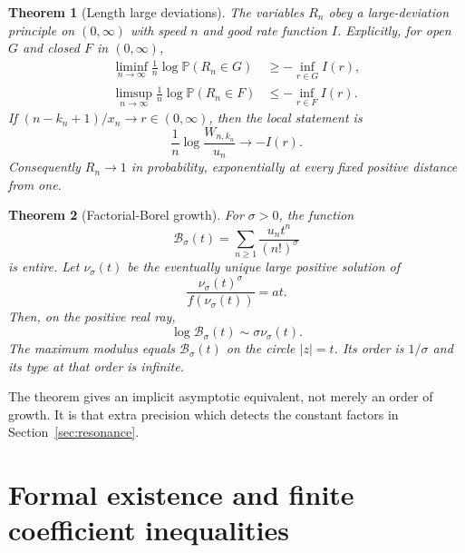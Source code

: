 \documentclass[11pt,a4paper]{article}
\numberwithin{equation}{section}
\newtheorem{theorem}{Theorem}[section]
\theoremstyle{definition}
\theoremstyle{remark}
\newcommand{\Bcal}{\mathcal B}
\newcommand{\Prob}{\mathbb P}
\begin{document}
\begin{theorem}[Length large deviations]
\label{thm:ldp}
The variables $R_n$ obey a large-deviation principle on $(0,\infty)$
with speed $n$ and good rate function $I$. Explicitly, for open $G$ and
closed $F$ in $(0,\infty)$,
\begin{align}
 \liminf_{n\to\infty}\frac1n\log\Prob(R_n\in G)
 &\ge-\inf_{r\in G}I(r),\\
 \limsup_{n\to\infty}\frac1n\log\Prob(R_n\in F)
 &\le-\inf_{r\in F}I(r).
 \label{eq:LDP}
\end{align}
If $(n-k_n+1)/x_n\to r\in(0,\infty)$, then the local statement is
\begin{equation}
 \frac1n\log\frac{W_{n,k_n}}{u_n}\longrightarrow-I(r).
 \label{eq:local-LDP}
\end{equation}
Consequently $R_n\to1$ in probability, exponentially at every fixed
positive distance from one.
\end{theorem}

\begin{theorem}[Factorial-Borel growth]
\label{thm:borel}
For $\sigma>0$, the function
\begin{equation}
 \Bcal_\sigma(t)=\sum_{n\ge1}\frac{u_nt^n}{(n!)^\sigma}
 \label{eq:Borel}
\end{equation}
is entire. Let $\nu_\sigma(t)$ be the eventually unique large positive
solution of
\begin{equation}
 \frac{\nu_\sigma(t)^\sigma}{f(\nu_\sigma(t))}=at.
 \label{eq:nu-definition}
\end{equation}
Then, on the positive real ray,
\begin{equation}
 \boxed{\quad\log\Bcal_\sigma(t)\sim\sigma\nu_\sigma(t).\quad}
 \label{eq:Borel-growth}
\end{equation}
The maximum modulus equals $\Bcal_\sigma(t)$ on the circle $|z|=t$.
Its order is $1/\sigma$ and its type at that order is infinite.
\end{theorem}

The theorem gives an implicit asymptotic equivalent, not merely an order
of growth. It is that extra precision which detects the constant factors
in Section~\ref{sec:resonance}.

\section{Formal existence and finite coefficient inequalities}
\label{sec:finite}
\end{document}
